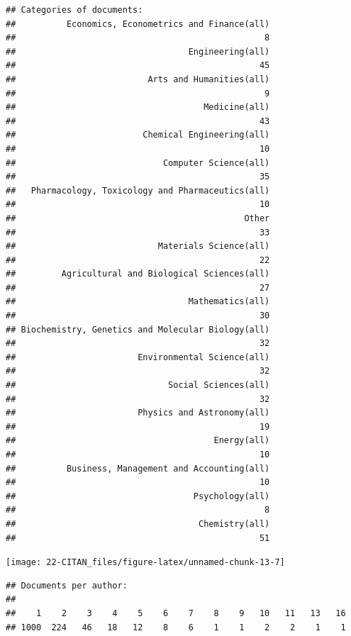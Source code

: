 \documentclass[]{book}
\begin{document}
\begin{verbatim}
## Categories of documents:
##          Economics, Econometrics and Finance(all) 
##                                                 8 
##                                  Engineering(all) 
##                                                45 
##                          Arts and Humanities(all) 
##                                                 9 
##                                     Medicine(all) 
##                                                43 
##                         Chemical Engineering(all) 
##                                                10 
##                             Computer Science(all) 
##                                                35 
##   Pharmacology, Toxicology and Pharmaceutics(all) 
##                                                10 
##                                             Other 
##                                                33 
##                            Materials Science(all) 
##                                                22 
##         Agricultural and Biological Sciences(all) 
##                                                27 
##                                  Mathematics(all) 
##                                                30 
## Biochemistry, Genetics and Molecular Biology(all) 
##                                                32 
##                        Environmental Science(all) 
##                                                32 
##                              Social Sciences(all) 
##                                                32 
##                        Physics and Astronomy(all) 
##                                                19 
##                                       Energy(all) 
##                                                10 
##          Business, Management and Accounting(all) 
##                                                10 
##                                   Psychology(all) 
##                                                 8 
##                                    Chemistry(all) 
##                                                51
\end{verbatim}

\begin{center}\texttt{[image: 22-CITAN\_files/figure-latex/unnamed-chunk-13-7]} \end{center}

\begin{verbatim}
## Documents per author:
## 
##    1    2    3    4    5    6    7    8    9   10   11   13   16 
## 1000  224   46   18   12    8    6    1    1    2    2    1    1
\end{verbatim}
\end{document}
